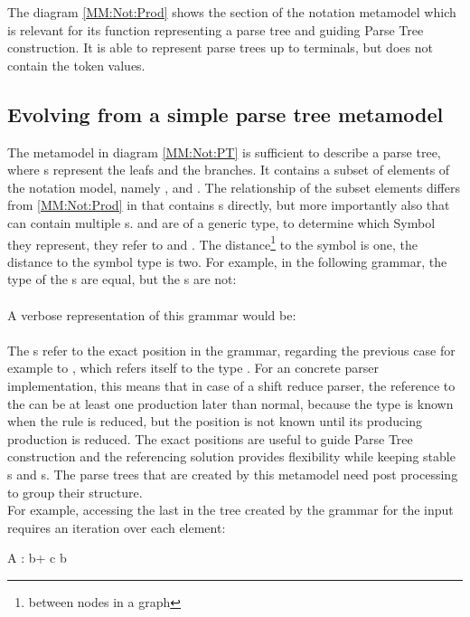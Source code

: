 The diagram \ref{MM:Not:Prod} shows the section of the notation metamodel which is relevant for its function representing a parse tree and guiding Parse Tree construction. It is able to represent parse trees up to terminals, but does not contain the token values.\\

\subsection{Evolving from a simple parse tree metamodel} The metamodel in diagram \ref{MM:Not:PT} is sufficient to describe a parse tree, where s represent the leafs and  the branches. It contains a subset of elements of the notation model, namely ,  and . The relationship of the subset elements differs from \ref{MM:Not:Prod} in that  contains s directly, but more importantly also that  can contain multiple s.  and  are of a generic type, to determine which Symbol they represent, they refer to  and . The distance\footnote{\raggedright between nodes in a graph} to the symbol is one, the distance to the symbol type is two. 
For example, in the following grammar, the type of the s are equal, but the s are not:\\
 \\
A verbose representation of this grammar would be: \\
 \\
The s refer to the exact position in the grammar, regarding the previous case for example to , which refers itself to the type . For an concrete parser implementation, this means that in case of a shift reduce parser, the reference to the  can be at least one production later than normal, because the type is known when the rule is reduced, but the position is not known until its producing production is reduced. The exact positions are useful to guide Parse Tree construction and the referencing solution provides flexibility while keeping stable s and s. The parse trees that are created by this metamodel need post processing to group their structure. \\
For example, accessing the last  in the tree created by the grammar for the input  requires an iteration over each element:\\
\begin{xtxt}
A : b+ c b 
\end{xtxt}


